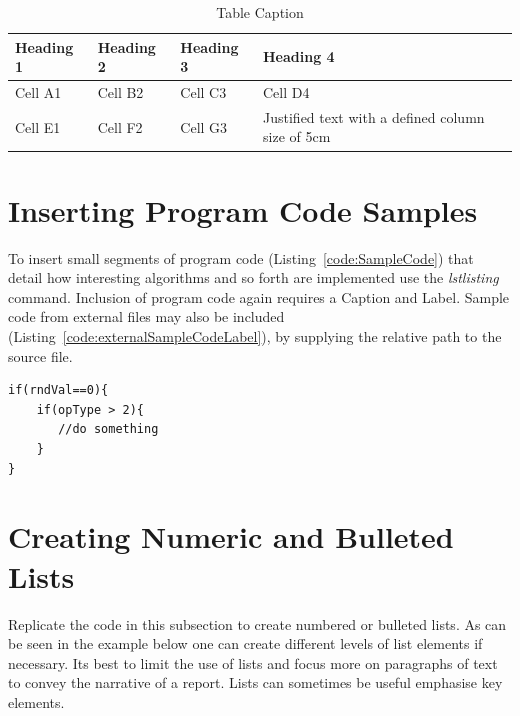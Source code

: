 \begin{table}[H]
\caption{Table Caption}\label{tab:using:TableExample}
\centering
\small
\begin{tabular}{lllp{5cm}}
\toprule \textbf{Heading 1}& \textbf{Heading 2}&\textbf{Heading 3}&\textbf{Heading 4}\\
\midrule
Cell A1 & Cell B2 & Cell C3 & Cell D4\\
Cell E1 & Cell F2 & Cell G3 & Justified text with a defined column size of 5cm\\
\bottomrule
\end{tabular}
\end{table}





\section{Inserting Program Code Samples}

To insert small segments of program code (Listing~\ref{code:SampleCode}) that detail how interesting algorithms and so forth are implemented use the \emph{lstlisting} command. Inclusion of program code again requires a Caption and Label. Sample code from external files may also be included (Listing~\ref{code:externalSampleCodeLabel}), by supplying the relative path to the source file. 

\begin{lstlisting}[caption=Sample Program Code Listing, label=code:SampleCode]
if(rndVal==0){
    if(opType > 2){
       //do something
    }
}
\end{lstlisting}



\section{Creating Numeric and Bulleted Lists}
Replicate the code in this subsection to create numbered or bulleted lists. As can be seen in the example below one can create different levels of list elements if necessary. Its best to limit the use of lists and focus more on paragraphs of text to convey the narrative of a report. Lists can sometimes be useful emphasise key elements. 

